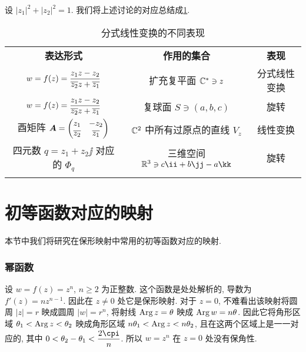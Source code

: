 设 $|z_1|^2+|z_2|^2=1$.
我们将上述讨论的对应总结成\ref{tab:fractal-transform-display}.

\begin{table}[!htb]
  \centering
  \begin{tabular}{ccc}
    \topcolorrule
      \bf 表达形式&
      \bf 作用的集合&
      \bf 表现\\
    \topcolorrule
      $w=f(z)=\dfrac{z_1z-z_2}{\overline{z_2}z+\overline{z_1}}$&
      扩充复平面 ${\mathbb{C}}^*\ni z$&
      分式线性变换\\
    \midcolorrule
      $w=f(z)=\dfrac{z_1z-z_2}{\overline{z_2}z+\overline{z_1}}$&
      复球面 $S\ni (a,b,c)$&
      旋转\\
    \midcolorrule
      酉矩阵 ${\boldsymbol{A}}=\begin{pmatrix}
        z_1&-z_2\\
        \overline{z_2}&\overline{z_1}
      \end{pmatrix}$&
      ${\mathbb{C}}^2$ 中所有过原点的直线 $V_z$&
      线性变换\\
    \midcolorrule
      四元数 $q=z_1+z_2\jj$ 对应的 $\Phi_q$&
      三维空间 $\BR^3\ni c\ii+b\jj-a\kk$&
      旋转\\
    \bottomcolorrule
  \end{tabular}
  \caption{分式线性变换的不同表现}
  \label{tab:fractal-transform-display}
\end{table}



\section{初等函数对应的映射}

本节中我们将研究在保形映射中常用的初等函数对应的映射.

\subsubsection{幂函数}

设 $w=f(z)=z^n$, $n\ge2$ 为正整数.
这个函数是处处解析的, 导数为 $f'(z)=nz^{n-1}$.
因此在 $z\neq0$ 处它是保形映射.
对于 $z=0$, 不难看出该映射将圆周 $|z|=r$ 映成圆周 $|w|=r^n$, 将射线 $\operatorname{Arg} z=\theta$ 映成 $\operatorname{Arg} w=n\theta$.
因此它将角形区域 $\theta_1<\operatorname{Arg} z<\theta_2$ 映成角形区域 $n\theta_1<\operatorname{Arg} z<n\theta_2$, 且在这两个区域上是一一对应的, 其中 $0<\theta_2-\theta_1<\dfrac{2\cpi}n$.
所以 $w=z^n$ 在 $z=0$ 处没有保角性.

